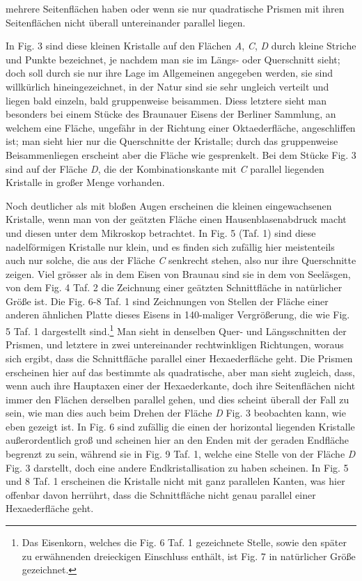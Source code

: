 \documentclass[a4paper, 11pt, oneside]{article}
\begin{document}
mehrere Seitenflächen haben oder wenn sie nur quadratische Prismen mit ihren Seitenflächen nicht überall untereinander parallel liegen.

In Fig. 3 sind diese kleinen Kristalle auf den Flächen \emph{A}, \emph{C}, \emph{D} durch kleine Striche und Punkte bezeichnet, je nachdem man sie im Längs- oder Querschnitt sieht; doch soll durch sie nur ihre Lage im Allgemeinen angegeben werden, sie sind willkürlich hineingezeichnet, in der Natur sind sie sehr ungleich verteilt und liegen bald einzeln, bald gruppenweise beisammen. Diess letztere sieht man besonders bei einem Stücke des Braunauer Eisens der Berliner Sammlung, an welchem eine Fläche, ungefähr in der Richtung einer Oktaederfläche, angeschliffen ist; man sieht hier nur die Querschnitte der Kristalle; durch das gruppenweise Beisammenliegen erscheint aber die Fläche wie gesprenkelt. Bei dem Stücke Fig. 3 sind auf der Fläche \emph{D}, die der Kombinationskante mit \emph{C} parallel liegenden Kristalle in großer Menge vorhanden.

Noch deutlicher als mit bloßen Augen erscheinen die kleinen eingewachsenen Kristalle, wenn man von der geätzten Fläche einen Hausenblasenabdruck macht und diesen unter dem Mikroskop betrachtet. In Fig. 5 (Taf. 1) sind diese nadelförmigen Kristalle nur klein, und es finden sich zufällig hier meistenteils auch nur solche, die aus der Fläche \emph{C} senkrecht stehen, also nur ihre Querschnitte zeigen. Viel grösser als in dem Eisen von Braunau sind sie in dem von Seeläsgen, von dem Fig. 4 Taf. 2 die Zeichnung einer geätzten Schnittfläche in natürlicher Größe ist. Die Fig. 6-8 Taf. 1 sind Zeichnungen von Stellen der Fläche einer anderen ähnlichen Platte dieses Eisens in 140-maliger Vergrößerung, die wie Fig. 5 Taf. 1 dargestellt sind.\footnote{Das Eisenkorn, welches die Fig. 6 Taf. 1 gezeichnete Stelle, sowie den später zu erwähnenden dreieckigen Einschluss enthält, ist Fig. 7 in natürlicher Größe gezeichnet.} Man sieht in denselben Quer- und Längsschnitten der Prismen, und letztere in zwei untereinander rechtwinkligen Richtungen, woraus sich ergibt, dass die Schnittfläche parallel einer Hexaederfläche geht. Die Prismen erscheinen hier auf das bestimmte als quadratische, aber man sieht zugleich, dass, wenn auch ihre Hauptaxen einer der Hexaederkante, doch ihre Seitenflächen nicht immer den Flächen derselben parallel gehen, und dies scheint überall der Fall zu sein, wie man dies auch beim Drehen der Fläche \emph{D} Fig. 3 beobachten kann, wie eben gezeigt ist. In Fig. 6 sind zufällig die einen der horizontal liegenden Kristalle außerordentlich groß und scheinen hier an den Enden mit der geraden Endfläche begrenzt zu sein, während sie in Fig. 9 Taf. 1, welche eine Stelle von der Fläche \emph{D} Fig. 3 darstellt, doch eine andere Endkristallisation zu haben scheinen. In Fig. 5 und 8 Taf. 1 erscheinen die Kristalle nicht mit ganz parallelen Kanten, was hier offenbar davon herrührt, dass die Schnittfläche nicht genau parallel einer Hexaederfläche geht.
\end{document}
